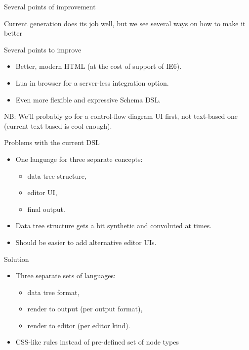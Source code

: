 \documentclass[handout]{beamer}
\begin{document}
\begin{frame}{Several points of improvement}

Current generation does its job well, but we see several ways on how to make it better

Several points to improve

\begin{itemize}
\item Better, modern HTML (at the cost of support of IE6).
\item Lua in browser for a server-less integration option.
\item Even more flexible and expressive Schema DSL.
\end{itemize}

NB: We'll probably go for a control-flow diagram UI first, not text-based one (current text-based is cool enough).


\begin{frame}{Problems with the current DSL}

\begin{itemize}
\item One language for three separate concepts:
\begin{itemize}
  \item data tree structure,
  \item editor UI,
  \item final output.
\end{itemize}
\item Data tree structure gets a bit synthetic and convoluted at times.
\item Should be easier to add alternative editor UIs.
\end{itemize}

\end{frame}


\begin{frame}{Solution}

\begin{itemize}
\item Three separate sets of languages:
\begin{itemize}
  \item data tree format,
  \item render to output (per output format),
  \item render to editor (per editor kind).
\end{itemize}
\item CSS-like rules instead of pre-defined set of node types
\end{itemize}


\end{frame}
\end{frame}
\end{document}
